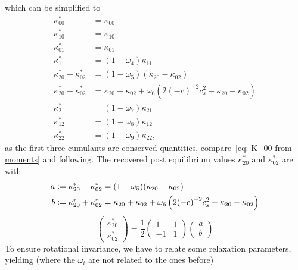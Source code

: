 \documentclass{article}
\begin{document}
which can be simplified to
\begin{equation}
  \begin{aligned}
    \kappa_{00}^{*} & = \kappa_{00} \\
    \kappa_{10}^{*} & = \kappa_{10} \\
    \kappa_{01}^{*} & = \kappa_{01} \\
    \kappa_{11}^{*} & = (1-\omega_4)\kappa_{11} \\
    \kappa_{20}^{*} - \kappa_{02}^{*}
      & = (1-\omega_5) (\kappa_{20} - \kappa_{02}) \\
    \kappa_{20}^{*} + \kappa_{02}^{*}
      & = \kappa_{20} + \kappa_{02} + \omega_6 \left( 2 {(-c)}^{-2} c_s^2 - \kappa_{20} - \kappa_{02} \right) \\
    \kappa_{21}^{*} & = (1-\omega_7)\kappa_{21} \\
    \kappa_{12}^{*} & = (1-\omega_8)\kappa_{12} \\
    \kappa_{22}^{*} & = (1-\omega_9)\kappa_{22},
  \end{aligned}
\end{equation}
as the first three cumulants are conserved quantities, compare~\eqref{eq: K_00 from moments} and following.
%
The recovered post equilibrium values $\kappa_{20}^{*}$ and $\kappa_{02}^{*}$ are with
\begin{equation}
  \begin{aligned}
    a \mathrel{\mathop:}= \kappa_{20}^{*} - \kappa_{02}^{*}
      & = (1-\omega_5) (\kappa_{20} - \kappa_{02}) \\
    b \mathrel{\mathop:}= \kappa_{20}^{*} + \kappa_{02}^{*}
      & = \kappa_{20} + \kappa_{02} + \omega_6 \left( 2 {(-c)}^{-2} c_s^2 - \kappa_{20} - \kappa_{02} \right)
  \end{aligned}
\end{equation}
\begin{equation}
  \begin{pmatrix}
    \kappa_{20}^{*} \\
    \kappa_{02}^{*}
  \end{pmatrix}
  = \frac{1}{2}
  \begin{pmatrix}
    1 & 1 \\ -1 & 1
  \end{pmatrix}
  \begin{pmatrix}
    a\\
    b
  \end{pmatrix}
\end{equation}
To ensure rotational invariance, we have to relate some relaxation parameters, yielding (where the $\omega_i$ are not related to the ones before)
\end{document}
